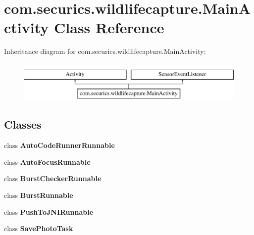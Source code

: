 \section{com.\+securics.\+wildlifecapture.\+Main\+Activity Class Reference}
\label{classcom_1_1securics_1_1wildlifecapture_1_1_main_activity}
Inheritance diagram for com.\+securics.\+wildlifecapture.\+Main\+Activity\+:\begin{figure}[H]
\begin{center}
\leavevmode
\includegraphics[height=2.000000cm]{classcom_1_1securics_1_1wildlifecapture_1_1_main_activity}
\end{center}
\end{figure}
\subsection*{Classes}
\begin{DoxyCompactItemize}
\item 
class {\bf Auto\+Code\+Runner\+Runnable}
\item 
class {\bf Auto\+Focus\+Runnable}
\item 
class {\bf Burst\+Checker\+Runnable}
\item 
class {\bf Burst\+Runnable}
\item 
class {\bf Push\+To\+J\+N\+I\+Runnable}
\item 
class {\bf Save\+Photo\+Task}
\end{DoxyCompactItemize}
